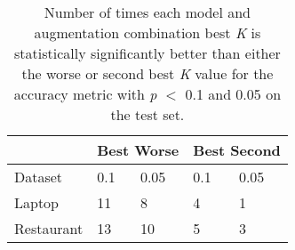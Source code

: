 \documentclass[11pt,a4paper]{article}
\begin{document}
\begin{table}[]
\begin{tabular}{|l|p{1cm}|p{1cm}|p{1cm}|p{1cm}|}
\hline
 &  \multicolumn{2}{l|}{Best Worse} & \multicolumn{2}{l|}{Best Second}  \\ 
\hline
Dataset &  0.1 & 0.05 & 0.1 & 0.05 \\ \hline
Laptop & 11 & 8 & 4 & 1 \\ \hline
Restaurant & 13 & 10 & 5 & 3 \\ \hline
\end{tabular}
\caption{Number of times each model and augmentation combination best \textit{K} is statistically significantly better than either the worse or second best \textit{K} value for the accuracy metric with \textit{p} $<$ 0.1 and 0.05 on the test set.}
\end{table}
\end{document}
